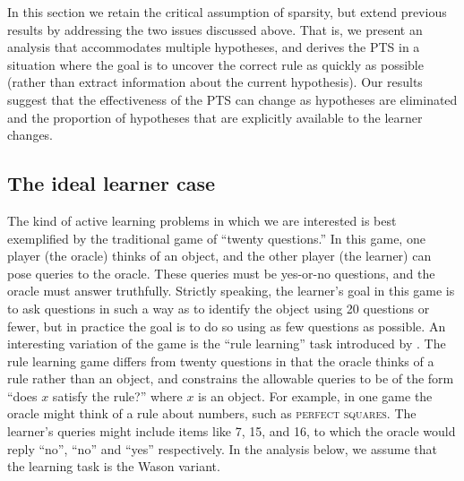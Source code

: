 \documentclass{apa}
\newcommand{\h}[1]{\textsc{#1}}
\begin{document}
In this section we retain the critical assumption of sparsity, but extend previous results by addressing the two issues discussed above. That is, we present an analysis that accommodates multiple hypotheses, and derives the PTS in a situation where the goal is to uncover the correct rule as quickly as possible (rather than extract information about the current hypothesis). Our results suggest that the effectiveness of the PTS can change as hypotheses are eliminated and the proportion of hypotheses that are explicitly available to the learner changes.


\subsection{The ideal learner case}

The kind of active learning problems in which we are interested is best exemplified by the traditional game of ``twenty questions.'' In this game, one player (the oracle) thinks of an object, and the other player (the learner) can pose queries to the oracle. These queries must be yes-or-no questions, and the oracle must answer truthfully. Strictly speaking, the learner's goal in this game is to ask questions in such a way as to identify the object using 20 questions or fewer, but in practice the goal is to do so using as few questions as possible. An interesting variation of the game is the ``rule learning'' task introduced by . The rule learning game differs from twenty questions in that the oracle thinks of a rule rather than an object, and constrains the allowable queries to be of the form ``does $x$ satisfy the rule?'' where $x$ is an object. For example, in one game the oracle might think of a rule about numbers, such as \h{perfect squares}. The learner's queries might include items like 7, 15, and 16, to which the oracle would reply ``no'', ``no'' and ``yes'' respectively. In the analysis below, we assume that the learning task is the Wason variant.
\end{document}
